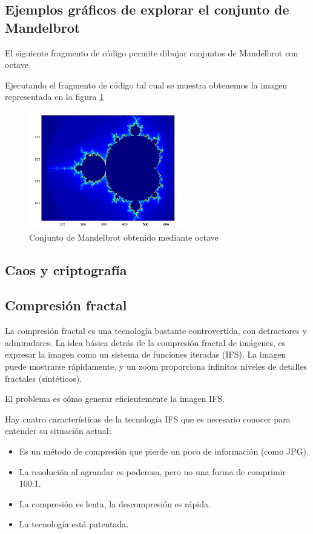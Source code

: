 \subsection{Ejemplos gráficos de explorar el conjunto de Mandelbrot}
El siguiente fragmento de código permite dibujar conjuntos de Mandelbrot con octave



Ejecutando el fragmento de código tal cual se muestra obtenemos la imagen representada en la figura \ref{fig:MandelbrotOctave}
\begin{figure}[hbtp]
\centering
\includegraphics[width = 0.6\textwidth]{img/mandelbrotOctave.png}
\caption{Conjunto de Mandelbrot obtenido mediante octave}
\label{fig:MandelbrotOctave}
\end{figure}

\subsection{Caos y criptografía}
\subsection{Compresión fractal}
La compresión fractal es una tecnología bastante controvertida, con detractores y admiradores. La idea básica detrás de la compresión fractal de imágenes, es expresar la imagen como un sistema de funciones iteradas (IFS). La imagen puede mostrarse rápidamente, y un zoom proporciona infinitos niveles de detalles fractales (sintéticos).

El problema es cómo generar eficientemente la imagen IFS.

Hay cuatro características de la tecnología IFS que es necesario conocer para entender su situación actual:
\begin{itemize}
\item Es un método de compresión que pierde un poco de información (como JPG).
\item La resolución al agrandar es poderosa, pero no una forma de comprimir 100:1.
\item La compresión es lenta, la descompresión es rápida.
\item La tecnología está patentada.
\end{itemize}

